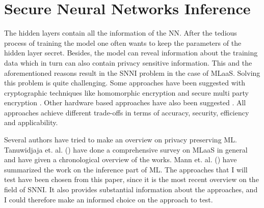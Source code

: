 \documentclass[../thesis.tex]{subfiles}
\begin{document}



\section{Secure Neural Networks Inference}
The hidden layers contain all the information of the NN. After the tedious process of training the model one often wants to keep the parameters of the hidden layer secret. Besides, the model can reveal information about the training data \parencite{qayyum2020} which in turn can also contain privacy sensitive information. This and the aforementioned reasons result in the SNNI problem in the case of MLaaS. Solving this problem is quite challenging. Some approaches have been suggested with cryptographic techniques like homomorphic encryption \parencite{rivest1978} and secure multi party encryption \parencite{yao1982, yao1986}. Other hardware based approaches have also been suggested \parencite{deepsecure}. All approaches achieve different trade-offs in terms of accuracy, security, efficiency and applicability. 

Several authors have tried to make an overview on privacy preserving ML. Tanuwidjaja et. al. (\citeyear{tanuwidjaja2020}) have done a comprehensive survey on MLaaS in general and have given a chronological overview of the works. Mann et. al. (\citeyear{mann22}) have summarized the work on the inference part of ML. The approaches that I will test have been chosen from this paper, since it is the most recent overview on the field of SNNI. It also provides substantial information about the approaches, and I could therefore make an informed choice on the approach to test.  
\end{document}
